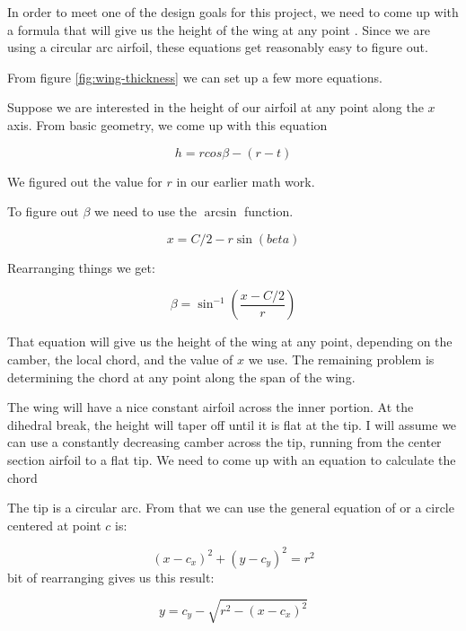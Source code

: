 In order to meet one of the design goals for this project, we need to come up
with a formula that will give us the height of the wing at any point . Since we
are using a circular arc airfoil, these equations get reasonably easy to figure
out.


From figure \ref{fig:wing-thickness} we can set up a few more equations.


Suppose we are interested in the height of our airfoil at any point along the
{$x$} axis. From basic geometry, we come up with this equation

\begin{equation}
  h = r cos{\beta} - ( r - t )
\end{equation}

We figured out the value for {$r$} in our earlier math work.


To figure out {$\beta$} we need to use the $\arcsin$ function.

\begin{equation}
  x = C / 2 - r \sin(beta)
\end{equation}

Rearranging things we get:

\begin{equation}
  \beta = \sin^{-1} ( \frac{x - C/2}{r} )
\end{equation}

That equation will give us the height of the wing at any point, depending on
the camber, the local chord, and the value of {$x$} we use. The remaining
problem is determining the chord at any point along the span of the wing.

The wing will have a nice constant airfoil across the inner portion. At the
dihedral break, the height will taper off until it is flat at the tip. I will
assume we can use a constantly decreasing camber across the tip, running from
the center section airfoil to a flat tip. We need to come up with an equation
to calculate the chord

The tip is a circular arc. From that we can use the general equation of or a
circle centered at point {$c$} is:

\begin{equation}
  {(x - c_x)}^2 + {(y - c_y)}^2 = r^2
\end{equation}
 bit of rearranging gives us this result:

\begin{equation}
  y = c_y - \sqrt{r^2 - (x - c_x)^{2}}
\end{equation}


